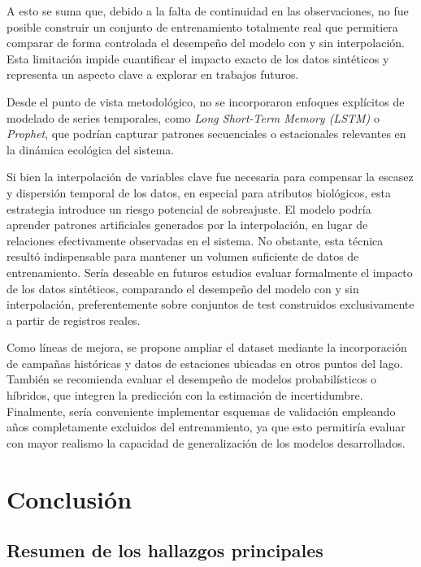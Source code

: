 \documentclass[
  11pt,
  pdftitle=TFI - Tschopp Joaquín S.,
  pdfauthor=Tschopp Joaquín S.,
  pdfcreator=LaTeX with hyperref,
]{report}  %
\begin{document}
A esto se suma que, debido a la falta de continuidad en las observaciones, no fue posible construir un conjunto de entrenamiento totalmente real que permitiera comparar de forma controlada el desempeño del modelo con y sin interpolación. Esta limitación impide cuantificar el impacto exacto de los datos sintéticos y representa un aspecto clave a explorar en trabajos futuros.

Desde el punto de vista metodológico, no se incorporaron enfoques explícitos de modelado de series temporales, como \textit{Long Short-Term Memory (LSTM)} o \textit{Prophet}, que podrían capturar patrones secuenciales o estacionales relevantes en la dinámica ecológica del sistema.

Si bien la interpolación de variables clave fue necesaria para compensar la escasez y dispersión temporal de los datos, en especial para atributos biológicos, esta estrategia introduce un riesgo potencial de sobreajuste. El modelo podría aprender patrones artificiales generados por la interpolación, en lugar de relaciones efectivamente observadas en el sistema. No obstante, esta técnica resultó indispensable para mantener un volumen suficiente de datos de entrenamiento. Sería deseable en futuros estudios evaluar formalmente el impacto de los datos sintéticos, comparando el desempeño del modelo con y sin interpolación, preferentemente sobre conjuntos de test construidos exclusivamente a partir de registros reales.

Como líneas de mejora, se propone ampliar el dataset mediante la incorporación de campañas históricas y datos de estaciones ubicadas en otros puntos del lago. También se recomienda evaluar el desempeño de modelos probabilísticos o híbridos, que integren la predicción con la estimación de incertidumbre. Finalmente, sería conveniente implementar esquemas de validación empleando años completamente excluidos del entrenamiento, ya que esto permitiría evaluar con mayor realismo la capacidad de generalización de los modelos desarrollados.

\chapter{Conclusión}

\section{Resumen de los hallazgos principales}
\end{document}
